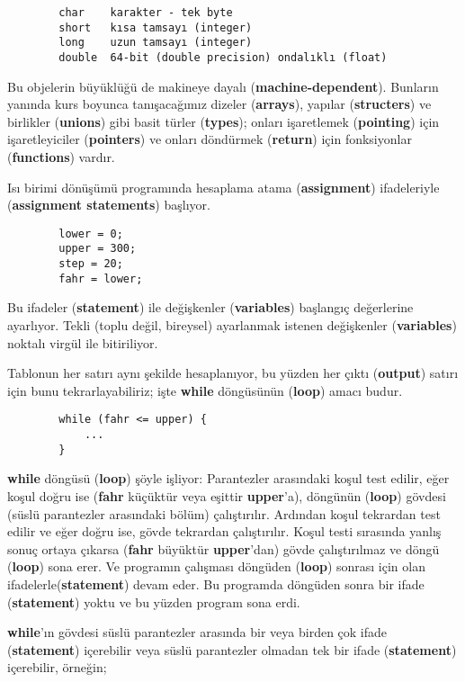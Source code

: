 \documentclass[a4paper,12pt,oneside]{book}
\begin{document}
\begin{lstlisting}
        char    karakter - tek byte
        short   kısa tamsayı (integer)
        long    uzun tamsayı (integer)
        double  64-bit (double precision) ondalıklı (float)
\end{lstlisting}
Bu objelerin büyüklüğü de makineye dayalı (\textbf{machine-dependent}). Bunların yanında kurs boyunca tanışacağımız dizeler (\textbf{arrays}), yapılar (\textbf{structers}) ve birlikler (\textbf{unions}) gibi basit türler (\textbf{types}); onları işaretlemek (\textbf{pointing}) için işaretleyiciler (\textbf{pointers}) ve onları döndürmek (\textbf{return}) için fonksiyonlar (\textbf{functions}) vardır. \pagebreak
\par Isı birimi dönüşümü programında hesaplama atama (\textbf{assignment}) ifadeleriyle (\textbf{assignment statements}) başlıyor.
\begin{lstlisting}
        lower = 0;
        upper = 300;
        step = 20;
        fahr = lower;
\end{lstlisting}
Bu ifadeler (\textbf{statement}) ile değişkenler (\textbf{variables}) başlangıç değerlerine ayarlıyor. Tekli (toplu değil, bireysel) ayarlanmak istenen değişkenler (\textbf{variables}) noktalı virgül ile bitiriliyor.
\par Tablonun her satırı aynı şekilde hesaplanıyor, bu yüzden her çıktı (\textbf{output}) satırı için bunu tekrarlayabiliriz; işte \textbf{while} döngüsünün (\textbf{loop}) amacı budur.
\begin{lstlisting}
        while (fahr <= upper) {
            ...
        }
\end{lstlisting}
\textbf{while} döngüsü (\textbf{loop}) şöyle işliyor: Parantezler arasındaki koşul test edilir, eğer koşul doğru ise (\textbf{fahr} küçüktür veya eşittir \textbf{upper}'a), döngünün (\textbf{loop}) gövdesi (süslü parantezler arasındaki bölüm) çalıştırılır. Ardından koşul tekrardan test edilir ve eğer doğru ise, gövde tekrardan çalıştırılır. Koşul testi sırasında yanlış sonuç ortaya çıkarsa (\textbf{fahr} büyüktür \textbf{upper}'dan) gövde çalıştırılmaz ve döngü (\textbf{loop}) sona erer. Ve programın çalışması döngüden (\textbf{loop}) sonrası için olan ifadelerle(\textbf{statement}) devam eder. Bu programda döngüden sonra bir ifade (\textbf{statement}) yoktu ve bu yüzden program sona erdi.
\par \textbf{while}'ın gövdesi süslü parantezler arasında bir veya birden çok ifade (\textbf{statement}) içerebilir veya süslü parantezler olmadan tek bir ifade (\textbf{statement}) içerebilir, örneğin;
\end{document}

